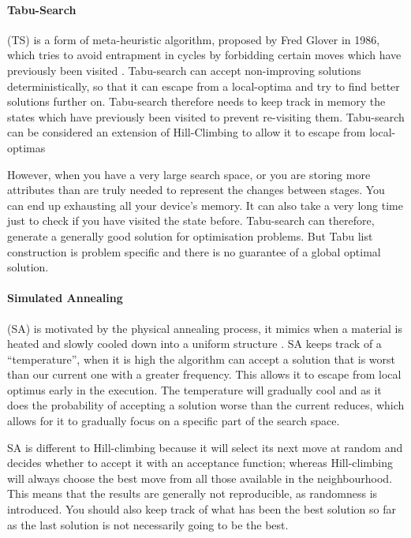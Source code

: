 \documentclass{article}
\begin{document}
\paragraph{Tabu-Search} (TS) is a form of meta-heuristic algorithm, proposed by Fred Glover in 1986, which tries to avoid entrapment in cycles by forbidding certain moves which have previously been visited \cite{RN35} \cite{RN37}. Tabu-search can accept non-improving solutions deterministically, so that it can escape from a local-optima and try to find better solutions further on. Tabu-search therefore needs to keep track in memory the states which have previously been visited to prevent re-visiting them. Tabu-search can be considered an extension of Hill-Climbing to allow it to escape from local-optimas


\par 
However, when you have a very large search space, or you are storing more attributes than are truly needed to represent the changes between stages. You can end up exhausting all your device's memory. It can also take a very long time just to check if you have visited the state before. Tabu-search can therefore, generate a generally good solution for optimisation problems. But Tabu list construction is problem specific and there is no guarantee of a global optimal solution. 


\paragraph{Simulated Annealing} (SA) is motivated by the physical annealing process, it mimics when a material is heated and slowly cooled down into a uniform structure \cite{RN35}. SA keeps track of a ``temperature'', when it is high the algorithm can accept a solution that is worst than our current one with a greater frequency. This allows it to escape from local optimus early in the execution. The temperature will gradually cool and as it does the probability of accepting a solution worse than the current reduces, which allows for it to gradually focus on a specific part of the search space.

\par 
SA is different to Hill-climbing because it will select its next move at random and decides whether to accept it with an acceptance function; whereas Hill-climbing will always choose the best move from all those available in the neighbourhood. This means that the results are generally not reproducible, as randomness is introduced. You should also keep track of what has been the best solution so far as the last solution is not necessarily going to be the best.
\end{document}
